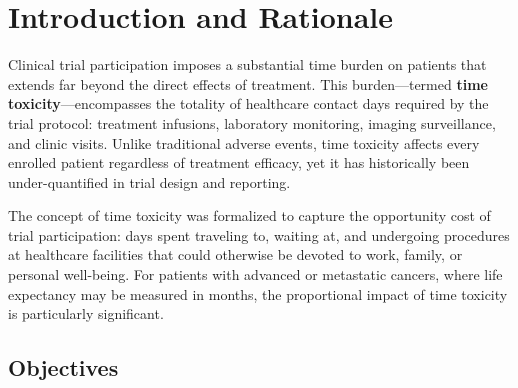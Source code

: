 \documentclass[11pt,a4paper]{article}
\begin{document}
\clearpage
\tableofcontents
\clearpage

\section{Introduction and Rationale}

Clinical trial participation imposes a substantial time burden on patients that extends far beyond the direct effects of treatment. This burden---termed \textbf{time toxicity}---encompasses the totality of healthcare contact days required by the trial protocol: treatment infusions, laboratory monitoring, imaging surveillance, and clinic visits. Unlike traditional adverse events, time toxicity affects every enrolled patient regardless of treatment efficacy, yet it has historically been under-quantified in trial design and reporting.

The concept of time toxicity was formalized to capture the opportunity cost of trial participation: days spent traveling to, waiting at, and undergoing procedures at healthcare facilities that could otherwise be devoted to work, family, or personal well-being. For patients with advanced or metastatic cancers, where life expectancy may be measured in months, the proportional impact of time toxicity is particularly significant.

\subsection{Objectives}
\end{document}

